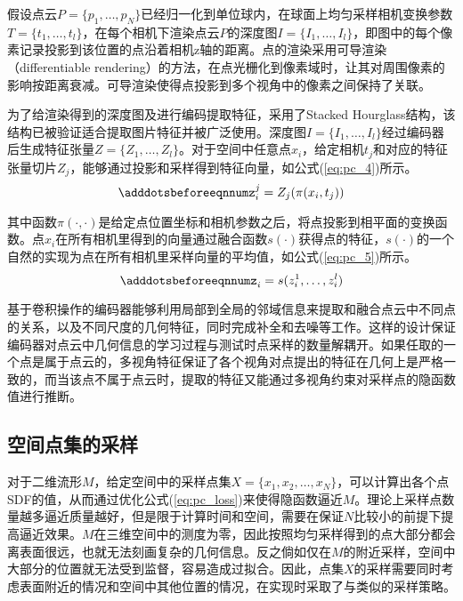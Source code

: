假设点云$P=\{p_1, \dots, p_N\}$已经归一化到单位球内，在球面上均匀采样相机变换参数$T=\{t_1, \dots, t_l\}$，在每个相机下渲染点云$P$的深度图$I=\{I_1, \dots, I_l\}$，即图中的每个像素记录投影到该位置的点沿着相机z轴的距离。点的渲染采用可导渲染（differentiable rendering）的方法，在点光栅化到像素域时，让其对周围像素的影响按距离衰减。可导渲染使得点投影到多个视角中的像素之间保持了关联。

为了给渲染得到的深度图及进行编码提取特征，采用了Stacked Hourglass结构\citep{newell2016}，该结构已被验证适合提取图片特征并被广泛使用。深度图$I=\{I_1, \dots, I_l\}$经过编码器后生成特征张量$Z=\{Z_1, \dots, Z_l\}$。对于空间中任意点$x_i$，给定相机$t_j$和对应的特征张量切片$Z_j$，能够通过投影和采样得到特征向量，如公式(\ref{eq:pc_4})所示。
\begin{equation} \label{eq:pc_4}
    \adddotsbeforeeqnnum%
    z_i^j = Z_j(\pi(x_i, t_j))
\end{equation}

其中函数$\pi(\cdot, \cdot)$是给定点位置坐标和相机参数之后，将点投影到相平面的变换函数。点$x_i$在所有相机里得到的向量通过融合函数$s(\cdot)$获得点的特征，$s(\cdot)$的一个自然的实现为点在所有相机里采样向量的平均值，如公式(\ref{eq:pc_5})所示。
\begin{equation} \label{eq:pc_5}
    \adddotsbeforeeqnnum%
    z_i= s(z_i^1, \dots, z_i^l)
\end{equation}

基于卷积操作的编码器能够利用局部到全局的邻域信息来提取和融合点云中不同点的关系，以及不同尺度的几何特征，同时完成补全和去噪等工作。这样的设计保证编码器对点云中几何信息的学习过程与测试时点采样的数量解耦开。如果任取的一个点是属于点云的，多视角特征保证了各个视角对点提出的特征在几何上是严格一致的，而当该点不属于点云时，提取的特征又能通过多视角约束对采样点的隐函数值进行推断。

\subsection{空间点集的采样}
对于二维流形$M$，给定空间中的采样点集$X = \{x_1, x_2, \dots, x_N\}$，可以计算出各个点SDF的值，从而通过优化公式(\ref{eq:pc_loss})来使得隐函数逼近$M$。理论上采样点数量越多逼近质量越好，但是限于计算时间和空间，需要在保证$N$比较小的前提下提高逼近效果。$M$在三维空间中的测度为零，因此按照均匀采样得到的点大部分都会离表面很远，也就无法刻画复杂的几何信息。反之倘如仅在$M$的附近采样，空间中大部分的位置就无法受到监督，容易造成过拟合。因此，点集$X$的采样需要同时考虑表面附近的情况和空间中其他位置的情况，在实现时采取了与\citet{saito2019pifu}类似的采样策略。

